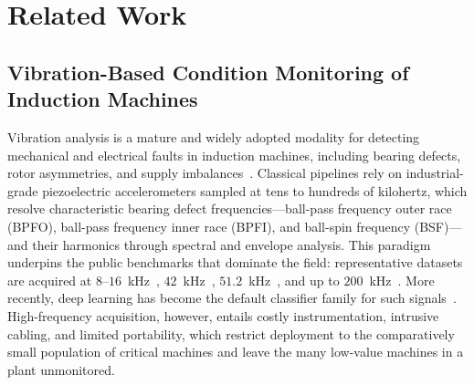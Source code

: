 \providecommand{\cmark}{\ding{51}}        %
\providecommand{\xmark}{\ding{55}}        %
\providecommand{\pmark}{$\sim$}            %

\section{Related Work}
\label{sec:related}

\subsection{Vibration-Based Condition Monitoring of Induction Machines}
Vibration analysis is a mature and widely adopted modality for detecting
mechanical and electrical faults in induction machines, including bearing defects,
rotor asymmetries, and supply imbalances~\cite{gangsar2020signal,
hamani2025advancements}. Classical pipelines rely on industrial-grade
piezoelectric accelerometers sampled at tens to hundreds of kilohertz, which
resolve characteristic bearing defect frequencies---ball-pass frequency outer
race (BPFO), ball-pass frequency inner race (BPFI), and ball-spin frequency
(BSF)---and their harmonics through spectral and envelope analysis. This paradigm underpins the
public benchmarks that dominate the field: representative datasets are acquired
at $8$--$16$~kHz~\cite{lee2024multidomain}, $42$~kHz~\cite{sehri2024ottawa},
$51.2$~kHz~\cite{thuan2023hust}, and up to $200$~kHz~\cite{huang2018bearing}.
More recently, deep learning has become the default classifier family for such
signals~\cite{yang2021fault, zhang2020deep}. High-frequency acquisition,
however, entails costly instrumentation, intrusive cabling, and limited
portability, which restrict deployment to the comparatively small population of
critical machines and leave the many low-value machines in a plant unmonitored.

